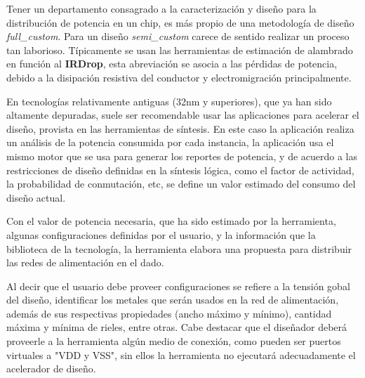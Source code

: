 Tener un departamento consagrado a la caracterización y diseño para la distribución de potencia en un chip, es más propio de una metodología de diseño \textit{full\_custom}. Para un diseño \textit{semi\_custom} carece de sentido realizar un proceso tan laborioso. Típicamente se usan las herramientas de estimación de alambrado en función al \textbf{IRDrop}, esta abreviación se asocia a las pérdidas de potencia, debido a la disipación resistiva del conductor y electromigración principalmente.

En tecnologías relativamente antiguas (32nm y superiores), que ya han sido altamente depuradas, suele ser recomendable usar las aplicaciones para acelerar el diseño, provista en las herramientas de síntesis. En este caso la aplicación realiza un análisis de la potencia consumida por cada instancia, la aplicación usa el mismo motor que se usa para generar los reportes de potencia, y de acuerdo a las restricciones de diseño definidas en la síntesis lógica, como el factor de actividad, la probabilidad de conmutación, etc, se define un valor estimado del consumo del diseño actual.

Con el valor de potencia necesaria, que ha sido estimado por la herramienta, algunas configuraciones definidas por el usuario, y la información que la biblioteca de la tecnología, la herramienta elabora una propuesta para distribuir las redes de alimentación en el dado.

Al decir que el usuario debe proveer configuraciones se refiere a la tensión gobal del diseño, identificar los metales que serán usados en la red de alimentación, además de sus respectivas propiedades (ancho máximo y mínimo), cantidad máxima y mínima de rieles, entre otras. Cabe destacar que el diseñador deberá proveerle a la herramienta algún medio de conexión, como pueden ser puertos virtuales a "VDD y VSS", sin ellos la herramienta no ejecutará adecuadamente el acelerador de diseño.

